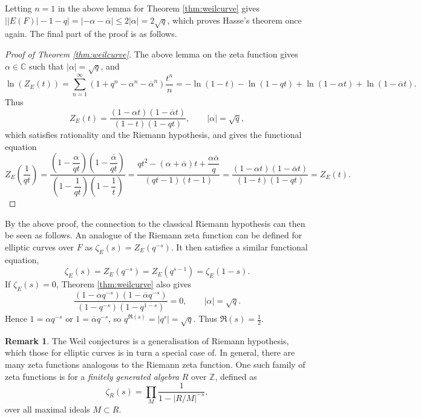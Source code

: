 \documentclass{article}
\newcommand{\Z}{\mathbb{Z}}
\newcommand{\C}{\mathbb{C}}
\newcommand{\rb}[1]{\left( #1 \right)}
\newcommand{\abs}[1]{\left\lvert #1 \right\rvert}
\theoremstyle{definition}\newtheorem*{definition}{Definition}
\theoremstyle{definition}\newtheorem*{example}{Example}
\theoremstyle{definition}\newtheorem*{remark}{Remark}
\begin{document}
Letting $ n = 1 $ in the above lemma for Theorem \ref{thm:weilcurve} gives $ \abs{\abs{E\rb{F}} - 1 - q} = \abs{-\alpha - \overline{\alpha}} \le 2\abs{\alpha} = 2\sqrt{q} $, which proves Hasse's theorem once again. The final part of the proof is as follows.

\begin{proof}[Proof of Theorem \ref{thm:weilcurve}]
The above lemma on the zeta function gives $ \alpha \in \C $ such that $ \abs{\alpha} = \sqrt{q} $, and
$$ \ln\rb{Z_E\rb{t}} = \sum_{n = 1}^\infty \rb{1 + q^n - \alpha^n - \overline{\alpha}^n}\dfrac{t^n}{n} = -\ln\rb{1 - t} - \ln\rb{1 - qt} + \ln\rb{1 - \alpha t} + \ln\rb{1 - \overline{\alpha} t}. $$
Thus
$$ Z_E\rb{t} = \dfrac{\rb{1 - \alpha t}\rb{1 - \overline{\alpha}t}}{\rb{1 - t}\rb{1 - qt}}, \qquad \abs{\alpha} = \sqrt{q}, $$
which satisfies rationality and the Riemann hypothesis, and gives the functional equation
$$ Z_E\rb{\dfrac{1}{qt}} = \dfrac{\rb{1 - \dfrac{\alpha}{qt}}\rb{1 - \dfrac{\overline{\alpha}}{qt}}}{\rb{1 - \dfrac{1}{qt}}\rb{1 - \dfrac{1}{t}}} = \dfrac{qt^2 - \rb{\alpha + \overline{\alpha}}t + \dfrac{\alpha\overline{\alpha}}{q}}{\rb{qt - 1}\rb{t - 1}} = \dfrac{\rb{1 - \alpha t}\rb{1 - \overline{\alpha}t}}{\rb{1 - t}\rb{1 - qt}} = Z_E\rb{t}. $$
\end{proof}

By the above proof, the connection to the classical Riemann hypothesis can then be seen as follows. An analogue of the Riemann zeta function can be defined for elliptic curves over $ F $ as $ \zeta_E\rb{s} = Z_E\rb{q^{-s}} $. It then satisfies a similar functional equation,
$$ \zeta_E\rb{s} = Z_E\rb{q^{-s}} = Z_E\rb{q^{s - 1}} = \zeta_E\rb{1 - s}. $$
If $ \zeta_E\rb{s} = 0 $, Theorem \ref{thm:weilcurve} also gives
$$ \dfrac{\rb{1 - \alpha q^{-s}}\rb{1 - \overline{\alpha}q^{-s}}}{\rb{1 - q^{-s}}\rb{1 - q^{1 - s}}} = 0, \qquad \abs{\alpha} = \sqrt{q}. $$
Hence $ 1 = \alpha q^{-s} $ or $ 1 = \overline{\alpha} q^{-s} $, so $ q^{\Re\rb{s}} = \abs{q^s} = \sqrt{q} $. Thus $ \Re\rb{s} = \tfrac{1}{2} $.

\begin{remark}
The Weil conjectures is a generalisation of Riemann hypothesis, which those for elliptic curves is in turn a special case of. In general, there are many zeta functions analogous to the Riemann zeta function. One such family of zeta functions is for a \emph{finitely generated algebra} $ R $ over $ \Z $, defined as
$$ \zeta_R\rb{s} = \prod_M \dfrac{1}{1 - \abs{R / M}^{-s}}, $$
over all maximal ideals $ M \subset R $.
\end{remark}
\end{document}

